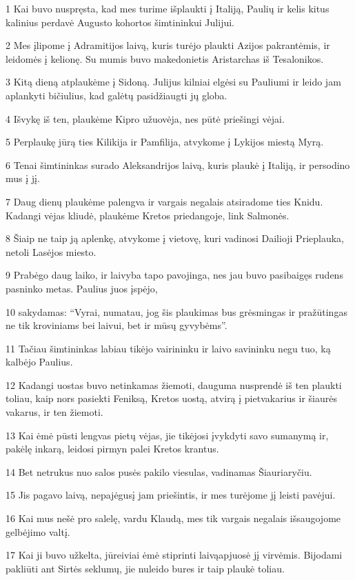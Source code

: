 \par 1 Kai buvo nuspręsta, kad mes turime išplaukti į Italiją, Paulių ir kelis kitus kalinius perdavė Augusto kohortos šimtininkui Julijui. 
\par 2 Mes įlipome į Adramitijos laivą, kuris turėjo plaukti Azijos pakrantėmis, ir leidomės į kelionę. Su mumis buvo makedonietis Aristarchas iš Tesalonikos. 
\par 3 Kitą dieną atplaukėme į Sidoną. Julijus kilniai elgėsi su Pauliumi ir leido jam aplankyti bičiulius, kad galėtų pasidžiaugti jų globa. 
\par 4 Išvykę iš ten, plaukėme Kipro užuovėja, nes pūtė priešingi vėjai. 
\par 5 Perplaukę jūrą ties Kilikija ir Pamfilija, atvykome į Lykijos miestą Myrą. 
\par 6 Tenai šimtininkas surado Aleksandrijos laivą, kuris plaukė į Italiją, ir persodino mus į jį. 
\par 7 Daug dienų plaukėme palengva ir vargais negalais atsiradome ties Knidu. Kadangi vėjas kliudė, plaukėme Kretos priedangoje, link Salmonės. 
\par 8 Šiaip ne taip ją aplenkę, atvykome į vietovę, kuri vadinosi Dailioji Prieplauka, netoli Lasėjos miesto. 
\par 9 Prabėgo daug laiko, ir laivyba tapo pavojinga, nes jau buvo pasibaigęs rudens pasninko metas. Paulius juos įspėjo, 
\par 10 sakydamas: “Vyrai, numatau, jog šis plaukimas bus grėsmingas ir pražūtingas ne tik kroviniams bei laivui, bet ir mūsų gyvybėms”. 
\par 11 Tačiau šimtininkas labiau tikėjo vairininku ir laivo savininku negu tuo, ką kalbėjo Paulius. 
\par 12 Kadangi uostas buvo netinkamas žiemoti, dauguma nusprendė iš ten plaukti toliau, kaip nors pasiekti Feniksą, Kretos uostą, atvirą į pietvakarius ir šiaurės vakarus, ir ten žiemoti. 
\par 13 Kai ėmė pūsti lengvas pietų vėjas, jie tikėjosi įvykdyti savo sumanymą ir, pakėlę inkarą, leidosi pirmyn palei Kretos krantus. 
\par 14 Bet netrukus nuo salos pusės pakilo viesulas, vadinamas Šiauriaryčiu. 
\par 15 Jis pagavo laivą, nepajėgusį jam priešintis, ir mes turėjome jį leisti pavėjui. 
\par 16 Kai mus nešė pro salelę, vardu Klaudą, mes tik vargais negalais išsaugojome gelbėjimo valtį. 
\par 17 Kai ji buvo užkelta, jūreiviai ėmė stiprinti laivą­apjuosė jį virvėmis. Bijodami pakliūti ant Sirtės seklumų, jie nuleido bures ir taip plaukė toliau. 
